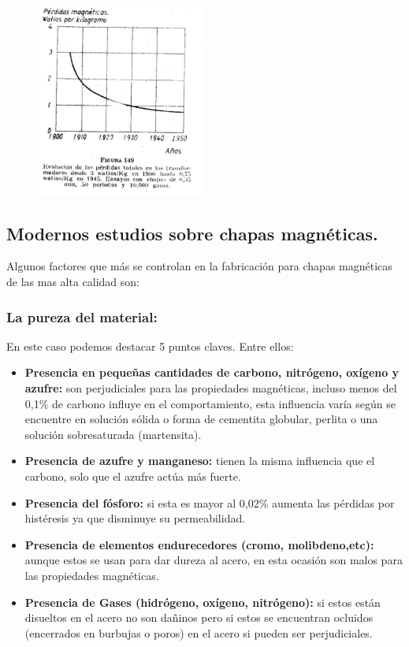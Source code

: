 \documentclass[12pt,a4paper]{article}
\begin{document}
  \begin{figure}[H]    
    \centering         
    \includegraphics[width=0.5\textwidth]{IMAGENES LATEX/3.jpg}
\end{figure}

\subsection{Modernos estudios sobre chapas magnéticas.}

Algunos factores que más se controlan en la fabricación para chapas magnéticas de las mas alta calidad son: 

\subsubsection{La pureza del material:}

En este caso podemos destacar 5 puntos claves. Entre ellos:

\begin{itemize}
    \item \textbf{Presencia en pequeñas cantidades de carbono, nitrógeno, oxígeno y azufre:} son perjudiciales para las propiedades magnéticas, incluso menos del 0,1\% de carbono influye en el comportamiento, esta influencia varía según se encuentre en solución sólida o forma de cementita globular, perlita o una solución sobresaturada (martensita).
    \item \textbf{Presencia de azufre y manganeso:}  tienen la misma influencia que el carbono, solo que el azufre actúa más fuerte.
    \item \textbf{Presencia del fósforo:} si esta es mayor al 0,02\% aumenta las pérdidas por histéresis ya que disminuye su permeabilidad.
    \item \textbf{Presencia de elementos endurecedores (cromo, molibdeno,etc):} aunque estos se usan para dar dureza al acero, en esta ocasión son malos para las propiedades magnéticas.
    \item \textbf{Presencia de Gases (hidrógeno, oxígeno, nitrógeno):} si estos están disueltos en el acero no son dañinos pero si estos se encuentran ocluidos (encerrados en burbujas o poros) en el acero si pueden ser perjudiciales.
\end{itemize}
\end{document}

